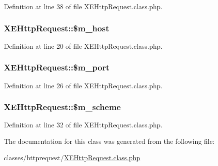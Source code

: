 Definition at line 38 of file X\-E\-Http\-Request.\-class.\-php.

\hypertarget{classXEHttpRequest_ad88148dced2b42017a96b2a5dd0b533a}{
\subsubsection[{\$m\-\_\-host}]{\setlength{\rightskip}{0pt plus 5cm}X\-E\-Http\-Request\-::\$m\-\_\-host}}\label{classXEHttpRequest_ad88148dced2b42017a96b2a5dd0b533a}


Definition at line 20 of file X\-E\-Http\-Request.\-class.\-php.

\hypertarget{classXEHttpRequest_a35c62f61b5ad2c200c53a58dd43a2784}{
\subsubsection[{\$m\-\_\-port}]{\setlength{\rightskip}{0pt plus 5cm}X\-E\-Http\-Request\-::\$m\-\_\-port}}\label{classXEHttpRequest_a35c62f61b5ad2c200c53a58dd43a2784}


Definition at line 26 of file X\-E\-Http\-Request.\-class.\-php.

\hypertarget{classXEHttpRequest_a501919f00934ef2cc76300fa32c2f19d}{
\subsubsection[{\$m\-\_\-scheme}]{\setlength{\rightskip}{0pt plus 5cm}X\-E\-Http\-Request\-::\$m\-\_\-scheme}}\label{classXEHttpRequest_a501919f00934ef2cc76300fa32c2f19d}


Definition at line 32 of file X\-E\-Http\-Request.\-class.\-php.



The documentation for this class was generated from the following file\-:\begin{DoxyCompactItemize}
\item 
classes/httprequest/\hyperlink{XEHttpRequest_8class_8php}{X\-E\-Http\-Request.\-class.\-php}\end{DoxyCompactItemize}
